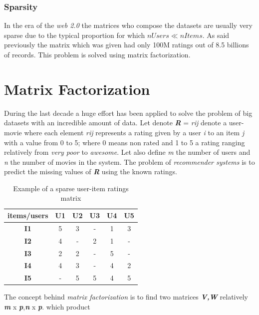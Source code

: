 \documentclass{sig-alternate-05-2015}
\begin{document}
\subsubsection{Sparsity}

In the era of the \textit{web 2.0} the matrices who compose the datasets are
usually very sparse due to the typical proportion for which  \(nUsers \ll nItems\).
As said previously the matrix which was given had only 100M ratings out of
8.5 billions of records. This problem is solved using matrix factorization.


\section{Matrix Factorization}

During the last decade a huge effort has been applied to solve the problem of
big datasets with an incredible amount of data.
Let denote {\large{\textit{\textbf{R}}} = \textit{r{\small ij}}} denote a
user-movie where each element \textit{r{\small ij}} represents a rating given by
a user \textit{i} to an item \textit{j} with a value from 0 to 5; where 0 means
non rated and 1 to 5 a rating ranging relatively from \textit{very poor} to \textit{awesome}.
Let also define \textit{m} the number of users and \textit{n} the number of movies in the system.
The problem of \textit{recommender systems} is to predict the missing values of {\large{\textit{\textbf{R}}}}
using the known ratings.\\
\begin{table}
\centering
\caption{Example of a sparse user-item ratings matrix}
\begin{tabular}{|c|c|c|c|c|c|} \hline
items/users  & \textbf{U1} & \textbf{U2} & \textbf{U3} & \textbf{U4} & \textbf{U5}\\ \hline
\textbf{I1} & 5 & 3 & - & 1 &  3  \\ \hline
\textbf{I2} & 4 & - & 2 & 1 &  -  \\ \hline
\textbf{I3} & 2 & 2 & - & 5 &  - \\ \hline
\textbf{I4} & 4 & 3 & - & 4 &  2  \\ \hline
\textbf{I5} & - & 5 & 5 & 4 &  5  \\ \hline
\end{tabular}
\end{table}
The concept behind \textit{matrix factorization} is to find two matrices
{\large\textit{\textbf{V,W}}} relatively \textit{\textbf{m}} x \textit{\textbf{p}},\textit{\textbf{n}} x \textit{\textbf{p}}. which product
\end{document}

